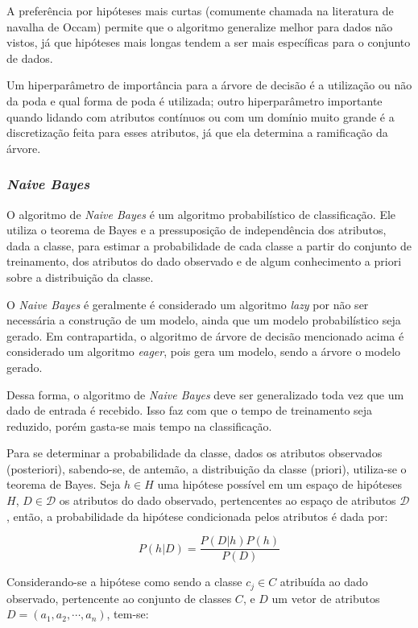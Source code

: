 \documentclass{article}
\begin{document}
A preferência por hipóteses mais curtas (comumente chamada na literatura de navalha de Occam) permite que o algoritmo generalize melhor para dados não vistos,
já que hipóteses mais longas tendem a ser mais específicas para o conjunto de dados.

Um hiperparâmetro de importância para a árvore de decisão é a utilização ou não da poda e qual forma de poda é utilizada;
outro hiperparâmetro importante quando lidando com atributos contínuos ou com um domínio muito grande é a discretização feita para esses atributos,
já que ela determina a ramificação da árvore.

\subsubsection{{\b \it Naive Bayes}}

O algoritmo de {\it Naive Bayes} é um algoritmo probabilístico de classificação.
Ele utiliza o teorema de Bayes e a pressuposição de independência dos atributos, dada a classe,
para estimar a probabilidade de cada classe a partir do conjunto de treinamento,
dos atributos do dado observado e de algum conhecimento a priori sobre a distribuição da classe.

O {\it Naive Bayes} é geralmente é considerado um algoritmo {\it lazy} por não ser necessária a construção de um modelo,
ainda que um modelo probabilístico seja gerado.
Em contrapartida, o algoritmo de árvore de decisão mencionado acima é considerado um algoritmo {\it eager}, pois gera um modelo, sendo a árvore o modelo gerado.

Dessa forma, o algoritmo de {\it Naive Bayes} deve ser generalizado toda vez que um dado de entrada é recebido.
Isso faz com que o tempo de treinamento seja reduzido, porém gasta-se mais tempo na classificação.

Para se determinar a probabilidade da classe, dados os atributos observados (posteriori),
sabendo-se, de antemão, a distribuição da classe (priori), utiliza-se o teorema de Bayes.
Seja $h \in H$ uma hipótese possível em um espaço de hipóteses $H$,
$D \in \mathcal{D}$ os atributos do dado observado, pertencentes ao espaço de atributos $\mathcal{D}$,
então, a probabilidade da hipótese condicionada pelos atributos é dada por:

\begin{equation}
P(h|D) = \frac{P(D|h) P(h)}{P(D)}
\end{equation}

Considerando-se a hipótese como sendo a classe $c_j \in C$
atribuída ao dado observado, pertencente ao conjunto de classes $C$, e $D$ um vetor de atributos $D = (a_1,a_2,\cdots,a_n)$, tem-se:
\end{document}
